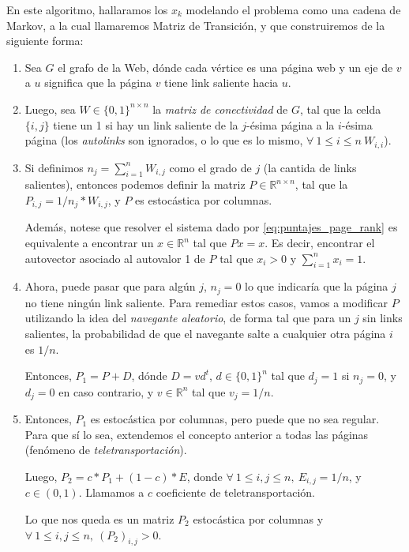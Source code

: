 En este algoritmo, hallaramos los $x_k$ modelando el problema como una cadena de
 Markov, a la cual llamaremos Matriz de Transición, y que construiremos de la siguiente forma:

\begin{enumerate}
	\item Sea $G$ el grafo de la Web, dónde cada vértice es una página web y un
		eje de $v$ a $u$ significa que la página $v$ tiene link saliente hacia $u$.
	\item Luego, sea $W\in\{0,1\}^{n \times n}$ la \textit{matriz de conectividad} de $G$, tal
        que la celda $\{i,j\}$ tiene un 1 si hay un link saliente de la $j$-ésima página
        a la $i$-ésima página (los \textit{autolinks} son ignorados, o lo que es lo mismo,
        $\forall\ 1\leq i\leq n\ W_{i,i}$).
	\item Si definimos $n_j = \sum\limits_{i=1}^{n}{W_{i,j}}$ como el grado de $j$
        (la cantida de links salientes), entonces podemos definir la matriz
        $P\in\mathbb{R}^{n \times n}$, tal que la $P_{i,j} = 1/n_{j} * W_{i,j} $, y
        $P$ es estocástica por columnas.

        Además, notese que resolver el sistema dado por \ref{eq:puntajes_page_rank}
        es equivalente a encontrar un $x\in\mathbb{R}^n$ tal que $Px=x$.
        Es decir, encontrar el autovector asociado al autovalor 1 de $P$ tal que
        $x_i > 0$ y $\sum\limits_{i=1}^{n}{x_i} = 1$.
    \item Ahora, puede pasar que para algún $j$, $n_j = 0$ lo que indicaría que
        la página $j$ no tiene ningún link saliente. Para remediar
        estos casos, vamos a modificar $P$ utilizando la idea del  \textit{navegante
        aleatorio}, de forma tal que para un $j$ sin links salientes, la probabilidad
        de que el navegante salte a cualquier otra página $i$ es $1/n$.

        Entonces, $P_{1} = P + D$, dónde $D = vd^{t}$, $d\in\{0,1\}^{n}$ tal que
        $d_j = 1$ si $n_j = 0$, y $d_j = 0$ en caso contrario, y $v\in\mathbb{R}^n$
         tal que $v_j = 1/n$.
    \item Entonces, $P_{1}$ es estocástica por columnas, pero puede que no sea regular.
        Para que sí lo sea, extendemos el concepto anterior a todas las páginas
        (fenómeno de \textit{teletransportación}).

        Luego, $P_{2} = c*P_{1} + (1-c)*E$, donde $\forall\ 1\leq i,j\leq n,\ E_{i,j} = 1/n$,
        y $c\in(0,1)$. Llamamos a $c$ coeficiente de teletransportación.

        Lo que nos queda es un matriz $P_{2}$ estocástica por columnas y $\forall\ 1\leq i,j\leq n,\ (P_{2})_{i,j} > 0$.
\end{enumerate}

